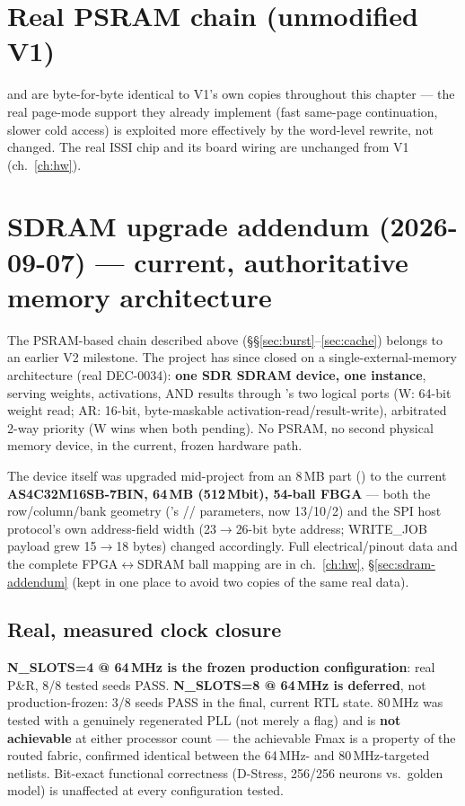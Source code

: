 \section{Real PSRAM chain (unmodified V1)}
 and  are byte-for-byte
identical to V1's own copies throughout this chapter --- the real
page-mode support they already implement (fast same-page continuation,
slower cold access) is exploited more effectively by the word-level
rewrite, not changed. The real ISSI  chip and
its board wiring are unchanged from V1 (ch.~\ref{ch:hw}).

\section{SDRAM upgrade addendum (2026-09-07) --- current, authoritative
memory architecture}
\label{sec:sdram-mem-addendum}
\begin{fnwarn}
The PSRAM-based chain described above (\S\S\ref{sec:burst}--\ref{sec:cache})
belongs to an earlier V2 milestone. The project has since closed on a
single-external-memory architecture (real  DEC-0034):
\textbf{one SDR SDRAM device, one  instance},
serving weights, activations, AND results through
's two logical ports (W: 64-bit weight
read; AR: 16-bit, byte-maskable activation-read/result-write), arbitrated
2-way priority (W wins when both pending). No PSRAM, no second physical
memory device, in the current, frozen hardware path.
\end{fnwarn}

The device itself was upgraded mid-project from an 8\,MB part
() to the current \textbf{AS4C32M16SB-7BIN,
64\,MB (512\,Mbit), 54-ball FBGA} --- both the row/column/bank geometry
('s //
 parameters, now 13/10/2) and the SPI host protocol's
own address-field width (23$\to$26-bit byte address; WRITE\_JOB payload
grew 15$\to$18 bytes) changed accordingly. Full electrical/pinout data
and the complete FPGA$\leftrightarrow$SDRAM ball mapping are in
ch.~\ref{ch:hw}, \S\ref{sec:sdram-addendum} (kept in one place to avoid
two copies of the same real data).

\subsection{Real, measured clock closure}
\textbf{N\_SLOTS=4 @ 64\,MHz is the frozen production configuration}:
real  P\&R, 8/8 tested seeds PASS. \textbf{N\_SLOTS=8
@ 64\,MHz is deferred}, not production-frozen: 3/8 seeds PASS in the
final, current RTL state. 80\,MHz was tested with a genuinely
regenerated PLL (not merely a  flag) and is \textbf{not
achievable} at either processor count --- the achievable Fmax is a
property of the routed fabric, confirmed identical between the
64\,MHz- and 80\,MHz-targeted netlists. Bit-exact functional
correctness (D-Stress, 256/256 neurons vs.\ golden model) is unaffected
at every configuration tested.

